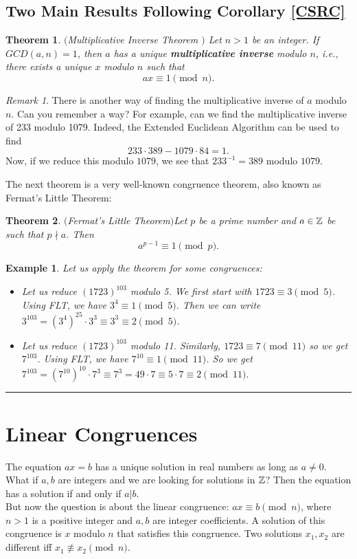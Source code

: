 \documentclass[12pt]{article}
\theoremstyle{plain}
\newtheorem{example}{Example}
\newtheorem{theorem}{Theorem}
\theoremstyle{definition}
\theoremstyle{remark}
\newtheorem{remark}{Remark}
\begin{document}
\subsection{Two Main Results Following Corollary \ref{CSRC}}
\begin{theorem}$($Multiplicative Inverse Theorem $)$ \label{MultInv}
Let $n>1$ be an integer. If $GCD(a,n)=1$, then $a$ has a {\it unique} {\bf multiplicative inverse} modulo $n$, i.e., there exists a unique $x$ modulo $n$ such that 
$$ax \equiv 1 \pmod{n}.$$
\end{theorem}

\bigskip
\begin{remark}
There is another way of finding the multiplicative inverse of $a$ modulo $n$. Can you remember a way? For example, can we find the multiplicative inverse of 233 modulo 1079. Indeed, the Extended Euclidean Algorithm can be used to find 
$$233\cdot 389-1079\cdot 84=1.$$
Now, if we reduce this modulo $1079$, we see that $233^{-1}=389$ modulo $1079$. 
\end{remark}

\bigskip
\noindent
The next theorem is a very well-known congruence theorem, also known as Fermat's Little Theorem:
\begin{theorem}$($Fermat's Little Theorem$)$\label{FLiT}
Let $p$ be a prime number and $a\in \mathbb{Z}$ be such that $p\nmid a$. Then $$a^{p-1}\equiv 1 \pmod{p}.$$
\end{theorem}
 \bigskip
 \begin{example}
 Let us apply the theorem for some congruences:
 \begin{itemize}
     \item Let us reduce $(1723)^{103}$ modulo 5.
We first start with $1723\equiv 3\pmod{5}$. Using FLT, we have $3^4\equiv 1\pmod{5}$. Then we can write $3^{103}=(3^4)^{25}\cdot 3^3 \equiv 3^3\equiv 2\pmod{5}$. 
     \item Let us reduce $(1723)^{103}$ modulo 11. Similarly, $1723\equiv 7 \pmod{11}$ so we get $7^{103}$. Using FLT, we have $7^{10}\equiv 1 \pmod{11}$. So we get $7^{103} = (7^{10})^{10}\cdot 7^3 \equiv 7^3 = 49\cdot 7 \equiv 5\cdot 7 \equiv 2\pmod{11}.$
      \end{itemize}
 \end{example}

\bigskip
\hrule
\section{Linear Congruences}
The equation $ax=b$ has a unique solution in real numbers as long as $a\neq 0$.\\
What if $a,b$ are integers and we are looking for solutions in $\mathbb{Z}$?
Then the equation has a solution if and only if $a|b$. \\
But now the question is about the linear congruence: $ax\equiv b \pmod{n}$, where $n>1$ is a positive integer and $a, b$ are integer coefficients. A solution of this congruence is $x$ modulo $n$ that satisfies this congruence. Two solutions $x_1, x_2$ are different iff $x_1\not \equiv x_2 \pmod{n}$.
\end{document}
